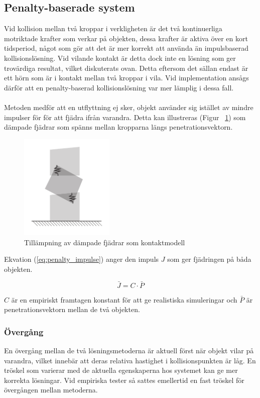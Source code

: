\documentclass[a4paper,12pt,twopage,swedish]{article}
\begin{document}
\subsection{Penalty-baserade system}
Vid kollision mellan två kroppar i verkligheten är det två kontinuerliga motriktade krafter som verkar på objekten, dessa krafter är aktiva över en kort tidsperiod, något som gör att det är mer korrekt att använda än impulsbaserad kollisionslösning. Vid vilande kontakt är detta dock inte en lösning som ger trovärdiga resultat, vilket diskuterats ovan. Detta eftersom det sällan endast är ett hörn som är i kontakt mellan två kroppar i vila. Vid implementation ansågs därför att en penalty-baserad kollisionslösning var mer lämplig i dessa fall.
\\
\\Metoden medför att en utflyttning ej sker, objekt använder sig istället av mindre impulser för för att fjädra ifrån varandra. Detta kan illustreras (Figur ~\ref{fig:penalty}) som dämpade fjädrar som spänns mellan kropparna längs penetrationsvektorn.

\begin{figure}[H]
	\centering
	\includegraphics[width=0.4\textwidth]{illustrations/penalty.pdf}
	\caption{Tillämpning av dämpade fjädrar som kontaktmodell}
	\label{fig:penalty}
\end{figure}

Ekvation (\ref{eq:penalty_impulse}) anger den impuls $J$ som ger fjädringen på båda objekten.

\begin{equation}\label{eq:penalty_impulse}
\bar{J} = C \cdot \bar{P}
\end{equation}

$C$ är en empiriskt framtagen konstant för att ge realistiska simuleringar och $\bar{P}$ är penetrationsvektorn mellan de två objekten.

\subsubsection{Övergång}
En övergång mellan de två lösningsmetoderna är aktuell först när objekt vilar på varandra, vilket innebär att deras relativa hastighet i kollisionspunkten är låg.
En tröskel som varierar med de aktuella egenskaperna hos systemet kan ge mer korrekta lösningar. Vid empiriska tester så sattes emellertid en fast tröskel för övergången mellan metoderna.
\end{document}

